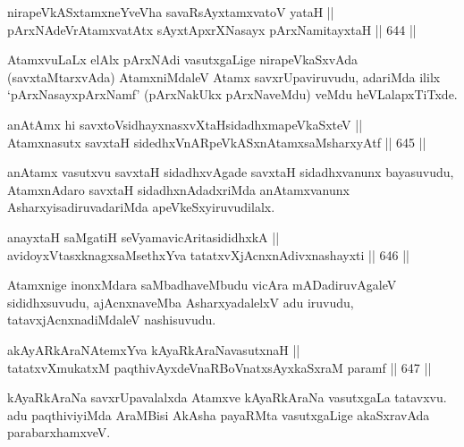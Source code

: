 \begin{shl}
nirapeVkASxtamxneYveVha savaRsAyx\s \s tamxvatoV yataH || \\
pArxNAdeVrAtamxvatAtx sAyxtApxrXNasayx pArxNamitayxtaH \hfill || 644 ||  
\end{shl}

\begin{artha}
AtamxvuLaLx elAlx pArxNAdi vasutxgaLige nirapeVkaSxvAda
(savxtaMtarxvAda) AtamxniMdaleV Atamx savxrUpaviruvudu, adariMda ililx\break
`pArxNasayxpArxNamf' (pArxNakUkx pArxNaveMdu) veMdu heVLalapxTiTxde.
\end{artha}

\begin{shl}
anAtAmx hi savxtoV\s sidhayxnasxvXtaHsidadhxmapeVkaSxteV || \\
Atamxnasutx savxtaH sidedhxVnARpeVkASx\s nAtamxsaMsharxyAtf \hfill || 645 ||  
\end{shl}

\begin{artha}
anAtamx vasutxvu savxtaH sidadhxvAgade savxtaH sidadhxvanunx
bayasuvudu, AtamxnAdaro savxtaH sidadhxnAdadxriMda anAtamxvanunx
AsharxyisadiruvadariMda apeVkeSxyiruvudilalx.
\end{artha}


\begin{shl}
anayxtaH saMgatiH seVyamavicAritasididhxkA || \\
avidoyxVtasxknagxsaMsethxYva tatatxvXjAcnxnAdivxnashayxti \hfill || 646 ||  
\end{shl}

\begin{artha}
Atamxnige inonxMdara saMbadhaveMbudu vicAra mADadiruvAgaleV
sididhxsuvudu, ajAcnxnaveMba AsharxyadalelxV adu iruvudu,
tatavxjAcnxnadiMdaleV nashisuvudu.
\end{artha}


\begin{shl}
akAyARkAraNAtemxYva kAyaRkAraNavasutxnaH || \\
tatatxvXmukatxM paqthivAyxdeVnaRBoVnatxsAyxkaSxraM paramf \hfill || 647 ||  
\end{shl}

\begin{artha}
kAyaRkAraNa savxrUpavalalxda Atamxve kAyaRkAraNa vasutxgaLa tatavxvu.
adu paqthiviyiMda AraMBisi AkAsha payaRMta vasutxgaLige akaSxravAda parabarxhamxveV.
\end{artha}

